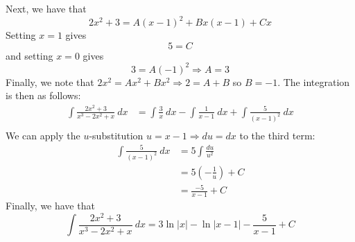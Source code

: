 \documentclass[11pt]{scrartcl}
\begin{document}
\noindent 
Next, we have that 
$$2x^2+3=A(x-1)^2+Bx(x-1)+Cx$$
\noindent 
Setting $x=1$ gives 
$$5=C$$
and setting $x=0$ gives 
$$3=A(-1)^2 \Rightarrow A=3$$
\noindent 
Finally, we note that $2x^2=Ax^2+Bx^2 \Rightarrow 2=A+B$ so $B=-1$.
\noindent 
The integration is then as follows: 
\begin{align*}
    \int\frac{2x^2+3}{x^3-2x^2+x} \ dx &=\int{\frac{3}{x} \ dx}-\int{\frac{1}{x-1} \ dx}+\int{\frac{5}{(x-1)^2} \ dx} \\
\end{align*}
\noindent 
We can apply the $u$-substitution $u=x-1 \Rightarrow du=dx$ to the third term: 
\begin{align*}
    \int{\frac{5}{(x-1)^2} \ dx} &=5\int{\frac{du}{u^2}} \\
                                 &=5(-\frac{1}{u})+C \\
                                 &=\frac{-5}{x-1}+C
\end{align*}
Finally, we have that 
$$\int{\frac{2x^2+3}{x^3-2x^2+x} \ dx}=3 \ln \lvert x \rvert -\ln \lvert x-1 \rvert -\frac{5}{x-1}+C $$
\end{document}

